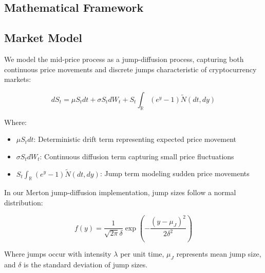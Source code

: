 \documentclass[twocolumn,ieee]{arithmaxresearch}
\begin{document}
\begin{onecolumn}
    
\section{Mathematical Framework}

\subsection{Market Model}

We model the mid-price process as a jump-diffusion process, capturing both continuous price movements and discrete jumps characteristic of cryptocurrency markets:

\begin{equation}
dS_t = \mu S_t dt + \sigma S_t dW_t + S_t \int_{\mathbb{R}} (e^y - 1) \tilde{N}(dt, dy)
\end{equation}

Where:
\begin{itemize}
    \item $\mu S_t dt$: Deterministic drift term representing expected price movement
    \item $\sigma S_t dW_t$: Continuous diffusion term capturing small price fluctuations
    \item $S_t \int_{\mathbb{R}} (e^y - 1) \tilde{N}(dt, dy)$: Jump term modeling sudden price movements
\end{itemize}

In our Merton jump-diffusion implementation, jump sizes follow a normal distribution:

\begin{equation}
f(y) = \frac{1}{\sqrt{2\pi}\delta} \exp\left(-\frac{(y-\mu_J)^2}{2\delta^2}\right)
\end{equation}

Where jumps occur with intensity $\lambda$ per unit time, $\mu_J$ represents mean jump size, and $\delta$ is the standard deviation of jump sizes.


\end{onecolumn}
\end{document}
